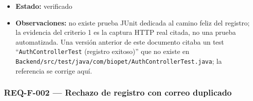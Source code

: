 \documentclass[
  spanish,
]{article}
\begin{document}
\begin{itemize}
  \texttt{POST\ /\allowbreak{}api/\allowbreak{}auth/\allowbreak{}registro}; DTO
  \texttt{Registro\allowbreak{}Request}/\texttt{Usuario\allowbreak{}Response}; evidencia
  \texttt{docs/\allowbreak{}mediciones/\allowbreak{}sec/\allowbreak{}A01-\allowbreak{}access-\allowbreak{}control.\allowbreak{}md} y
  \texttt{docs/\allowbreak{}mediciones/\allowbreak{}sec/\allowbreak{}raw/\allowbreak{}A01-\allowbreak{}access-\allowbreak{}control.\allowbreak{}txt}.
\item
  \textbf{Estado:} verificado
\item
  \textbf{Observaciones:} no existe prueba JUnit dedicada al camino
  feliz del registro; la evidencia del criterio 1 es la captura HTTP
  real citada, no una prueba automatizada. Una versión anterior de este
  documento citaba un test ``\texttt{Auth\allowbreak{}Controller\allowbreak{}Test} (registro
  exitoso)'' que no existe en
  \texttt{Backend/\allowbreak{}src/\allowbreak{}test/\allowbreak{}java/\allowbreak{}com/\allowbreak{}biopet/\allowbreak{}Auth\allowbreak{}Controller\allowbreak{}Test.\allowbreak{}java}; la
  referencia se corrige aquí.
\end{itemize}

\subsubsection{REQ-F-002 --- Rechazo de registro con correo
duplicado}\label{req-f-002-rechazo-de-registro-con-correo-duplicado}
\end{document}
